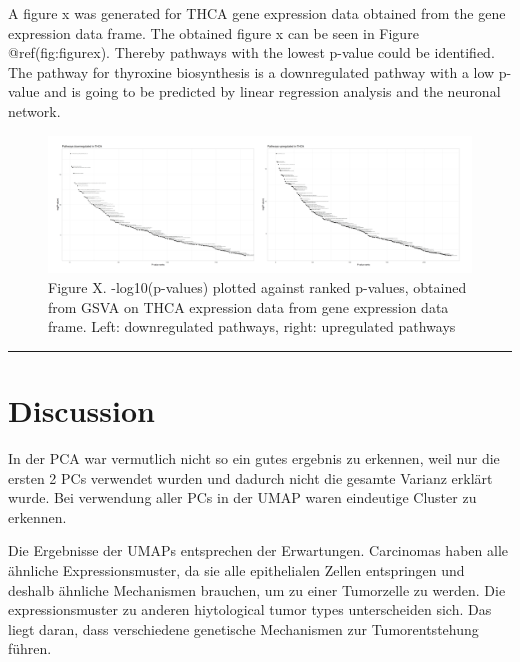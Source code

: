 \documentclass[
  parskip,
  oneside]{scrreprt}
\begin{document}
A figure x was generated for THCA gene expression data obtained from the
gene expression data frame. The obtained figure x can be seen in Figure
@ref(fig:figurex). Thereby pathways with the lowest p-value could be
identified. The pathway for thyroxine biosynthesis is a downregulated
pathway with a low p-value and is going to be predicted by linear
regression analysis and the neuronal network.

\begin{figure}

{\centering \includegraphics[width=1\linewidth]{figures/2figurexTHCA} 

}

\caption{Figure X. -log10(p-values) plotted against ranked p-values, obtained from GSVA on THCA expression data from gene expression data frame. Left: downregulated pathways, right: upregulated pathways}\label{fig:figurex}
\end{figure}

\begin{center}\rule{0.5\linewidth}{0.5pt}\end{center}

\hypertarget{discussion}{%
\chapter{Discussion}\label{discussion}}

In der PCA war vermutlich nicht so ein gutes ergebnis zu erkennen, weil
nur die ersten 2 PCs verwendet wurden und dadurch nicht die gesamte
Varianz erklärt wurde. Bei verwendung aller PCs in der UMAP waren
eindeutige Cluster zu erkennen.

Die Ergebnisse der UMAPs entsprechen der Erwartungen. Carcinomas haben
alle ähnliche Expressionsmuster, da sie alle epithelialen Zellen
entspringen und deshalb ähnliche Mechanismen brauchen, um zu einer
Tumorzelle zu werden. Die expressionsmuster zu anderen hiytological
tumor types unterscheiden sich. Das liegt daran, dass verschiedene
genetische Mechanismen zur Tumorentstehung führen.
\end{document}
